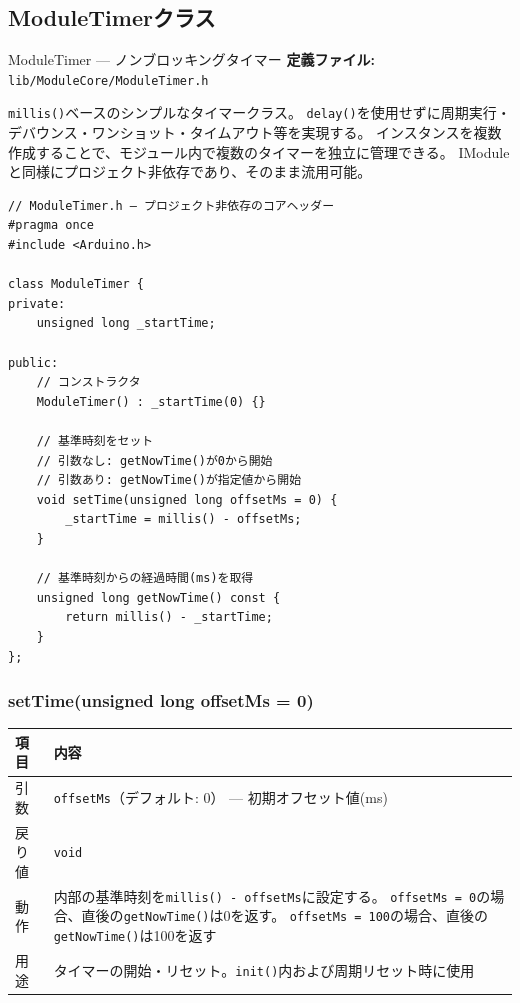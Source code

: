 
\subsection{ModuleTimerクラス}

\begin{apibox}{ModuleTimer — ノンブロッキングタイマー}
\textbf{定義ファイル:} \texttt{lib/ModuleCore/ModuleTimer.h}

\texttt{millis()}ベースのシンプルなタイマークラス。
\texttt{delay()}を使用せずに周期実行・デバウンス・ワンショット・タイムアウト等を実現する。
インスタンスを複数作成することで、モジュール内で複数のタイマーを独立に管理できる。
IModuleと同様にプロジェクト非依存であり、そのまま流用可能。
\end{apibox}

\begin{lstlisting}[style=cppstyle, caption={ModuleTimerクラス定義}]
// ModuleTimer.h — プロジェクト非依存のコアヘッダー
#pragma once
#include <Arduino.h>

class ModuleTimer {
private:
    unsigned long _startTime;

public:
    // コンストラクタ
    ModuleTimer() : _startTime(0) {}

    // 基準時刻をセット
    // 引数なし: getNowTime()が0から開始
    // 引数あり: getNowTime()が指定値から開始
    void setTime(unsigned long offsetMs = 0) {
        _startTime = millis() - offsetMs;
    }

    // 基準時刻からの経過時間(ms)を取得
    unsigned long getNowTime() const {
        return millis() - _startTime;
    }
};
\end{lstlisting}

\subsubsection{setTime(unsigned long offsetMs = 0)}

\begin{tabularx}{\textwidth}{l X}
\toprule
\textbf{項目} & \textbf{内容} \\
\midrule
引数 & \texttt{offsetMs}（デフォルト: 0） — 初期オフセット値(ms) \\
戻り値 & \texttt{void} \\
動作 & 内部の基準時刻を\texttt{millis() - offsetMs}に設定する。
       \texttt{offsetMs = 0}の場合、直後の\texttt{getNowTime()}は0を返す。
       \texttt{offsetMs = 100}の場合、直後の\texttt{getNowTime()}は100を返す \\
用途 & タイマーの開始・リセット。\texttt{init()}内および周期リセット時に使用 \\
\bottomrule
\end{tabularx}

